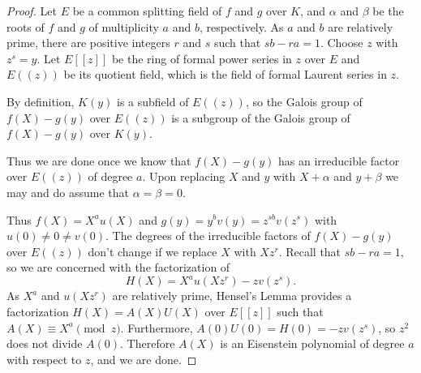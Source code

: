 \documentclass[10pt,a4paper]{amsart}
\begin{document}
\begin{proof}
  Let $E$ be a common splitting field of $f$ and $g$ over $K$, and
  $\alpha$ and $\beta$ be the roots of $f$ and $g$ of multiplicity $a$
  and $b$, respectively. As $a$ and $b$ are relatively prime, there
  are positive integers $r$ and $s$ such that $sb-ra=1$. Choose $z$
  with $z^s=y$. Let $E[[z]]$ be the ring of formal power series in $z$
  over $E$ and $E((z))$ be its quotient field, which is the field of
  formal Laurent series in $z$.

  By definition, $K(y)$ is a subfield of $E((z))$, so the Galois group
  of $f(X)-g(y)$ over $E((z))$ is a subgroup of the Galois group of
  $f(X)-g(y)$ over $K(y)$.

  Thus we are done once we know that $f(X)-g(y)$ has an irreducible
  factor over $E((z))$ of degree $a$. Upon replacing $X$ and $y$ with
  $X+\alpha$ and $y+\beta$ we may and do assume that $\alpha=\beta=0$.

  Thus $f(X)=X^au(X)$ and $g(y)=y^bv(y)=z^{sb}v(z^s)$ with
  $u(0)\ne0\ne v(0)$. The degrees of the irreducible factors of
  $f(X)-g(y)$ over $E((z))$ don't change if we replace $X$ with
  $Xz^r$. Recall that $sb-ra=1$, so we are concerned with the
  factorization of\[ H(X)=X^au(Xz^r)-zv(z^s).
  \]
  As $X^a$ and $u(Xz^r)$ are relatively prime, Hensel's Lemma provides
  a factorization $H(X)=A(X)U(X)$ over $E[[z]]$ such that
  $A(X)\equiv X^a\pmod{z}$. %
  Furthermore, $A(0)U(0)=H(0)=-zv(z^s)$, so $z^2$ does not divide
  $A(0)$. Therefore $A(X)$ is an Eisenstein polynomial of degree $a$
  with respect to $z$, and we are done.
\end{proof}
\end{document}
